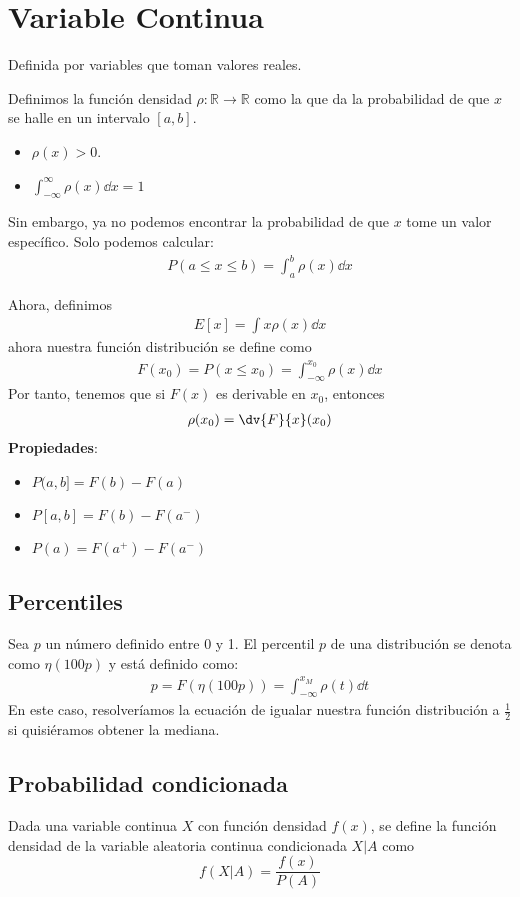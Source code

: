 \documentclass{./Probabilidad.tex}
\begin{document}
\chapter{Variable Continua}
Definida por variables que toman valores reales.
\begin{defin}
	Definimos la función densidad $\rho: \mathbb{R} \to \mathbb{R}$ como la que da la probabilidad de que $x$ se halle en un intervalo $[a,b]$.
	\begin{itemize}
		\item $\rho(x)> 0$.
		\item $\int_{-\infty}^{\infty} \rho(x)\dd{x} = 1$ 
	\end{itemize}
	Sin embargo, ya no podemos encontrar la probabilidad de que $x$ tome un valor específico. Solo podemos calcular:
	\begin{equation}
		\begin{split}
			P(a \leq x \leq b) = \int_{a}^{b} \rho(x) \dd{x}
		\end{split}
	\end{equation}
\end{defin}
Ahora, definimos
\begin{equation}
	\begin{split}
		E[x] = \int x \rho(x) \dd{x}
	\end{split}
\end{equation}
ahora nuestra función distribución se define como
\begin{equation}
	\begin{split}
		F(x_0) = P(x \leq x_0) = \int_{-\infty}^{x_0} \rho(x) \dd{x}
	\end{split}
\end{equation}
Por tanto, tenemos que si $F(x)$ es derivable en $x_0$, entonces
\begin{equation}
	\begin{split}
		\rho(x_0) = \dv{F}{x}(x_0)
	\end{split}
\end{equation}
\textbf{Propiedades}:
\begin{itemize}
	\item $P(a,b]= F(b) - F(a)$ 
	\item $P[a,b] = F(b) - F(a^{-})$ 
	\item $P(a) = F(a^{+}) - F(a^{-})$ 
\end{itemize}
\section{Percentiles}
Sea $p$ un número definido entre 0 y 1. El percentil $p$ de una distribución se denota como $\eta(100p)$ y está definido como:
\begin{equation}
	\begin{split}
		p = F(\eta(100p)) = \int_{-\infty}^{x_{M}}\rho(t)\dd{t}
	\end{split}
\end{equation}
En este caso, resolveríamos la ecuación de igualar nuestra función distribución a $\frac{1}{2}$ si quisiéramos obtener la mediana. 
\section{Probabilidad condicionada}
Dada una variable continua \(X\) con función densidad \(f(x)\), se define la función densidad de la
variable aleatoria continua condicionada \(X | A\) como
\[
	f(X | A) = \frac{f(x)}{P(A)}
\]
\end{document}
